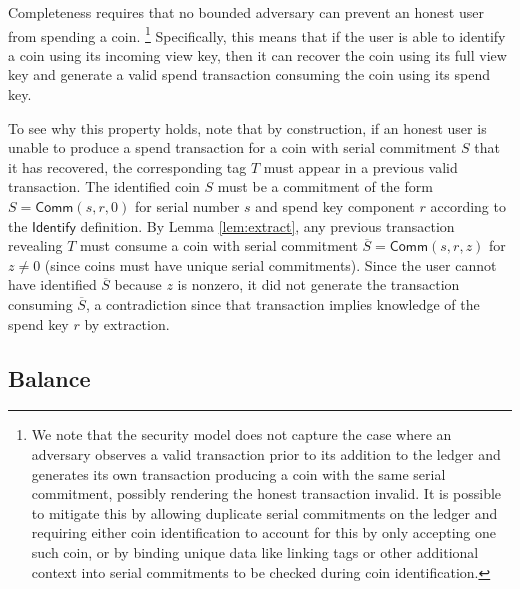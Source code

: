 \documentclass{llncs}
\newcommand{\func}[1]{\mathsf{#1}}
\newcommand{\comm}{\func{Comm}}
\begin{document}
Completeness requires that no bounded adversary can prevent an honest user from spending a coin.
\footnote{We note that the security model does not capture the case where an adversary observes a valid transaction prior to its addition to the ledger and generates its own transaction producing a coin with the same serial commitment, possibly rendering the honest transaction invalid.
It is possible to mitigate this by allowing duplicate serial commitments on the ledger and requiring either coin identification to account for this by only accepting one such coin, or by binding unique data like linking tags or other additional context into serial commitments to be checked during coin identification.}
Specifically, this means that if the user is able to identify a coin using its incoming view key, then it can recover the coin using its full view key and generate a valid spend transaction consuming the coin using its spend key.

To see why this property holds, note that by construction, if an honest user is unable to produce a spend transaction for a coin with serial commitment $S$ that it has recovered, the corresponding tag $T$ must appear in a previous valid transaction.
The identified coin $S$ must be a commitment of the form $S = \comm(s,r,0)$ for serial number $s$ and spend key component $r$ according to the $\func{Identify}$ definition.
By Lemma \ref{lem:extract}, any previous transaction revealing $T$ must consume a coin with serial commitment $\overline{S} = \comm(s,r,z)$ for $z \neq 0$ (since coins must have unique serial commitments).
Since the user cannot have identified $\overline{S}$ because $z$ is nonzero, it did not generate the transaction consuming $\overline{S}$, a contradiction since that transaction implies knowledge of the spend key $r$ by extraction.


\subsection{Balance}
\end{document}
